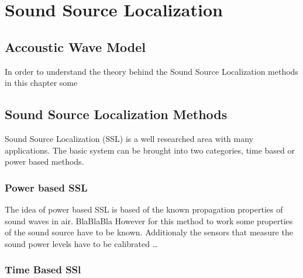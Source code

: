 \graphicspath{ {images/2_source_localization/} }
\chapter{Sound Source Localization}
\section{Accoustic Wave Model}
In order to understand the theory behind the Sound Source Localization methods
in this chapter some 
\section{Sound Source Localization Methods}
Sound Source Localization (SSL)  is a well researched area with many applications.
\cite{nat_skript}
The basic system can be brought into two categories, time based or power based methods.
\subsection{Power based SSL}
The idea of power based SSL is based of the known propagation properties of sound waves in air.
BlaBlaBla 
However for this method to work some properties of the sound source have to be known.
Additionaly the sensors that measure the sound power levels have to be calibrated \dots 

\subsection{Time Based SSl}



